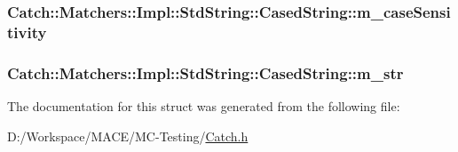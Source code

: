 \subsubsection[{\texorpdfstring{m\+\_\+case\+Sensitivity}{m_caseSensitivity}}]{ Catch\+::\+Matchers\+::\+Impl\+::\+Std\+String\+::\+Cased\+String\+::m\+\_\+case\+Sensitivity}\hypertarget{struct_catch_1_1_matchers_1_1_impl_1_1_std_string_1_1_cased_string_af399ed93051d8981e298206dee6898b3}{}\label{struct_catch_1_1_matchers_1_1_impl_1_1_std_string_1_1_cased_string_af399ed93051d8981e298206dee6898b3}
\subsubsection[{\texorpdfstring{m\+\_\+str}{m_str}}]{ Catch\+::\+Matchers\+::\+Impl\+::\+Std\+String\+::\+Cased\+String\+::m\+\_\+str}\hypertarget{struct_catch_1_1_matchers_1_1_impl_1_1_std_string_1_1_cased_string_a9f8ce063a934330ac59bf8638f047e99}{}\label{struct_catch_1_1_matchers_1_1_impl_1_1_std_string_1_1_cased_string_a9f8ce063a934330ac59bf8638f047e99}


The documentation for this struct was generated from the following file\+:\begin{DoxyCompactItemize}
\item 
D\+:/\+Workspace/\+M\+A\+C\+E/\+M\+C-\/\+Testing/\hyperlink{_catch_8h}{Catch.\+h}\end{DoxyCompactItemize}
